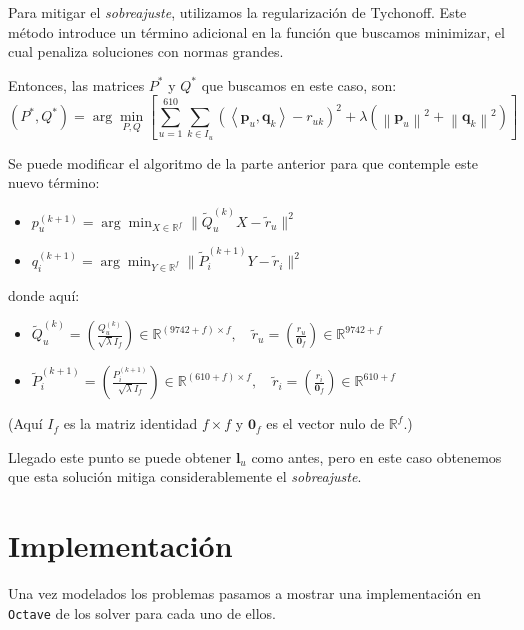 \documentclass[12pt,a4paper]{article}
\begin{document}
Para mitigar el \textit{sobreajuste}, utilizamos la regularización de Tychonoff. Este método introduce un término adicional en la función que buscamos minimizar, el cual penaliza soluciones con normas grandes.

Entonces, las matrices \(P^*\) y \(Q^*\) que buscamos en este caso, son:
\[
  (P^*, Q^*) = \arg\min_{P, Q}  \left[\sum_{u=1}^{610} \sum_{k \in I_u} (\left\langle \mathbf{p}_u, \mathbf{q}_k \right\rangle - r_{uk})^2 + \lambda(\left\lVert \mathbf{p}_u\right\rVert^2  + \left\lVert \mathbf{q}_k\right\rVert^2 ) \right]
\]

Se puede modificar el algoritmo de la parte anterior para que contemple este nuevo término:

\begin{itemize}
  \item \( p_u^{(k+1)} = \arg\min_{X \in \mathbb{R}^f} \| \tilde{Q}_u^{(k)} X - \tilde{r}_u \|^2 \)
  \item \( q_i^{(k+1)} = \arg\min_{Y \in \mathbb{R}^f} \| \tilde{P}_i^{(k+1)} Y - \tilde{r}_i \|^2 \)
\end{itemize}

donde aquí:

\begin{itemize}
  \item \( \tilde{Q}_u^{(k)} = \left(\frac{Q_u^{(k)}}{\sqrt{\lambda} I_f}\right)  \in \mathbb{R}^{(9742+f) \times f}, \quad \tilde{r}_u = \left(\frac{r_u}{\mathbf{0}_f}\right)  \in \mathbb{R}^{9742+f} \)
  \item \( \tilde{P}_i^{(k+1)} =  \left(\frac{P_i^{(k+1)}}{\sqrt{\lambda} I_f}\right)  \in \mathbb{R}^{(610+f) \times f}, \quad \tilde{r}_i =  \left(\frac{r_i}{\mathbf{0}_f}\right) \in \mathbb{R}^{610+f} \)
\end{itemize}

(Aquí \( I_f \) es la matriz identidad \( f \times f \) y \( \mathbf{0}_f \) es el vector nulo de \( \mathbb{R}^f \).)


Llegado este punto se puede obtener \(\mathbf{l}_u\) como antes, pero en este caso obtenemos que esta solución mitiga considerablemente el \textit{sobreajuste}.

\section*{Implementación}

Una vez modelados los problemas pasamos a mostrar una implementación en \texttt{Octave} de los solver para cada uno de ellos.
\end{document}
